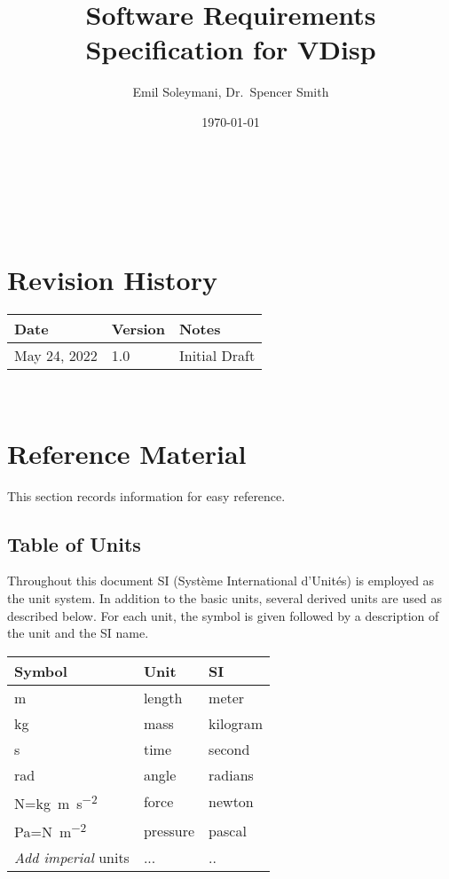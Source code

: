 \documentclass[12pt]{article}
\begin{document}
\title{Software Requirements Specification for VDisp} 
\author{Emil Soleymani, Dr.\ Spencer Smith}
\date{\today}
	
\maketitle

~\newpage


\tableofcontents

~\newpage

\section*{Revision History}

\begin{tabularx}{\textwidth}{p{3cm}p{2cm}X}
\toprule {\bf Date} & {\bf Version} & {\bf Notes}\\
\midrule
May 24, 2022 & 1.0 & Initial Draft\\
\bottomrule
\end{tabularx}

~\newpage

\section{Reference Material}

This section records information for easy reference.

\subsection{Table of Units}

Throughout this document SI (Syst\`{e}me International d'Unit\'{e}s) is employed
as the unit system.  In addition to the basic units, several derived units are
used as described below.  For each unit, the symbol is given followed by a
description of the unit and the SI name.
~\newline

\renewcommand{\arraystretch}{1.2}
  \noindent \begin{tabular}{l l l} 
    \toprule		
    \textbf{Symbol} & \textbf{Unit} & \textbf{SI}\\
    \midrule 
    \si{\metre} & length & meter\\
    \si{\kilogram} & mass	& kilogram\\
    \si{\second} & time & second\\
    \si{\radian} & angle & radians\\
    \si{\newton}=\si{\kilogram\meter\per\square\second} & force & newton\\
    \si{\pascal}=\si{\newton\per\square\meter} & pressure & pascal\\
    \emph{Add imperial} units & ... & ..\\
    \bottomrule
  \end{tabular}
\end{document}
